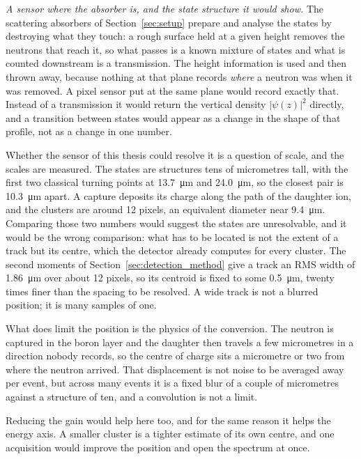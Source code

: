 \documentclass[a4paper,headsepline,oneside,11pt]{scrartcl}
\begin{document}
\emph{A sensor where the absorber is, and the state structure it would show.}
\label{sec:outlook_absorber}
The scattering absorbers of Section~\ref{sec:setup} prepare and analyse the
states by destroying what they touch: a rough surface held at a given height
removes the neutrons that reach it, so what passes is a known mixture of states
and what is counted downstream is a transmission. The height information is used
and then thrown away, because nothing at that plane records \emph{where} a
neutron was when it was removed. A pixel sensor put at the same plane would
record exactly that. Instead of a transmission it would return the vertical
density $|\psi(z)|^2$ directly, and a transition between states would appear as
a change in the shape of that profile, not as a change in one number.

Whether the sensor of this thesis could resolve it is a question of scale, and
the scales are measured. The states are structures tens of micrometres tall,
with the first two classical turning points at \SI{13.7}{\micro\metre} and
\SI{24.0}{\micro\metre}, so the closest pair is \SI{10.3}{\micro\metre} apart.
A capture deposits its charge along the path of the daughter ion, and the
clusters are around 12 pixels, an equivalent diameter near
\SI{9.4}{\micro\metre}. Comparing those two numbers would suggest the states
are unresolvable, and it would be the wrong comparison: what has to be located
is not the extent of a track but its centre, which the detector already computes
for every cluster. The second moments of Section~\ref{sec:detection_method} give a
track an RMS width of \SI{1.86}{\micro\metre} over about 12 pixels, so its
centroid is fixed to some \SI{0.5}{\micro\metre}, twenty times finer than the
spacing to be resolved. A wide track is not a blurred position; it is many
samples of one.

What does limit the position is the physics of the conversion. The neutron is
captured in the boron layer and the daughter then travels a few micrometres in a
direction nobody records, so the centre of charge sits a micrometre or two from
where the neutron arrived. That displacement is not noise to be averaged away
per event, but across many events it is a fixed blur of a couple of micrometres
against a structure of ten, and a convolution is not a limit.

Reducing the gain would help here too, and for the same reason it helps the
energy axis. A smaller cluster is a tighter estimate of its own centre, and one
acquisition would improve the position and open the spectrum at once.
\end{document}
